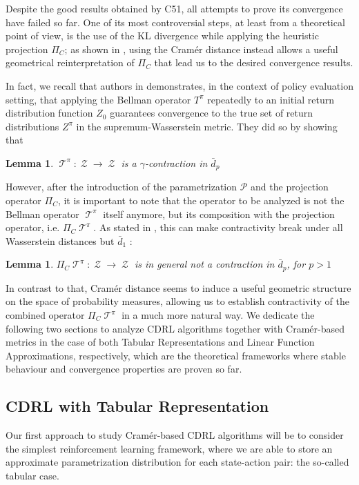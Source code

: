 \documentclass[12pt,a4paper,openright,twoside]{article}
\DeclareMathOperator*{\T}{\mathcal{T}}
\DeclareMathOperator*{\Z}{\mathcal{Z}}
\numberwithin{equation}{section}
\newtheorem{lemma}[theorem]{Lemma}
\theoremstyle{definition}
\theoremstyle{remark}
\theoremstyle{plain}
\begin{document}
Despite the good results obtained by C51, all attempts to prove its convergence have failed so far. One of its most controversial steps, at least from a theoretical point of view, is the use of the KL divergence while applying the heuristic projection $\Pi_{C}$; as shown in \cite{analysisC51}, using the Cramér distance instead allows a useful geometrical reinterpretation of $\Pi_{C}$ that lead us to the desired convergence results.

In fact, we recall that authors in \cite{DRL} demonstrates, in the context of policy evaluation setting, that applying the Bellman operator $T^{\pi}$ repeatedly to an initial return distribution function $Z_0$ guarantees convergence to the true set of return distributions $Z^\pi$ in the supremum-Wasserstein metric. They did so by showing that
\begin{lemma} \label{contractiondp}
	$\T^\pi : \Z \rightarrow \Z$ is a $\gamma$-contraction in $\bar{d}_p$
\end{lemma}

However, after the introduction of the parametrization $\mathcal{P}$ and the projection operator $\Pi_C$, it is important to note that the operator to be analyzed is not the Bellman operator $\T^\pi$ itself anymore, but its composition with the projection operator, i.e. $\Pi_C \T^\pi$. As stated in \cite{analysisC51}, this can make contractivity break under all Wasserstein distances but $\bar{d}_1$ :
\begin{lemma} \label{nocontractiondp}
	$\Pi_C \T^\pi : \Z \rightarrow \Z$ is in general not a contraction in $\bar{d}_p$, for $p>1$
\end{lemma}

In contrast to that, Cramér distance seems to induce a useful geometric structure on the space of probability measures, allowing us to establish contractivity of the combined operator $\Pi_C \T^\pi$ in a much more natural way. We dedicate the following two sections to analyze CDRL algorithms together with Cramér-based metrics in the case of both Tabular Representations and Linear Function Approximations, respectively, which are the theoretical frameworks where stable behaviour and convergence properties are proven so far.


\subsection{CDRL with Tabular Representation} \label{CDRLtabular}

Our first approach to study Cramér-based CDRL algorithms will be to consider the simplest reinforcement learning framework, where we are able to store an approximate parametrization distribution for each state-action pair: the so-called tabular case.
\end{document}
